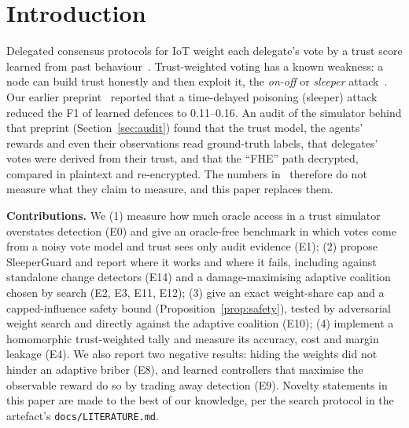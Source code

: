 \documentclass[conference]{IEEEtran}
\begin{document}
\section{Introduction}
Delegated consensus protocols for IoT weight each delegate's vote by a trust score learned from past
behaviour~\cite{muniswamy2025trust}. Trust-weighted voting has a known weakness: a node can build trust
honestly and then exploit it, the \emph{on-off} or \emph{sleeper} attack~\cite{chae2015onoff}.
Our earlier preprint~\cite{padia2025adaptive} reported that a time-delayed poisoning (sleeper) attack
reduced the F1 of learned defences to 0.11--0.16. An audit of the simulator behind that preprint
(Section~\ref{sec:audit}) found that the trust model, the agents' rewards and even their observations
read ground-truth labels, that delegates' votes were derived from their trust, and that the ``FHE'' path
decrypted, compared in plaintext and re-encrypted. The numbers in~\cite{padia2025adaptive} therefore do
not measure what they claim to measure, and this paper replaces them.

\textbf{Contributions.} We
(1) measure how much oracle access in a trust simulator overstates detection (E0) and give an oracle-free
benchmark in which votes come from a noisy vote model and trust sees only audit evidence (E1);
(2) propose SleeperGuard and report where it works and where it fails, including against standalone change
detectors (E14) and a
damage-maximising adaptive coalition chosen by search (E2, E3, E11, E12);
(3) give an exact weight-share cap and a capped-influence safety bound (Proposition~\ref{prop:safety}),
tested by adversarial weight search and directly against the adaptive coalition (E10);
(4) implement a homomorphic trust-weighted tally and measure its accuracy, cost and margin leakage (E4).
We also report two negative results: hiding the weights did not hinder an adaptive briber (E8), and learned
controllers that maximise the observable reward do so by trading away detection (E9).
Novelty statements in this paper are made to the best of our knowledge, per the search protocol in the
artefact's \texttt{docs/LITERATURE.md}.
\end{document}
